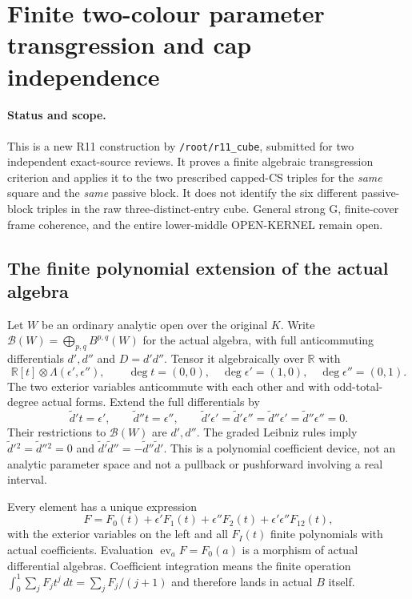 \section{Finite two-colour parameter transgression and cap independence}
\label{sec:r11-cap-parameter}

\paragraph{Status and scope.}
This is a new R11 construction by \texttt{/root/r11\_cube}, submitted
for two independent exact-source reviews.  It proves a finite algebraic
transgression criterion and applies it to the two prescribed capped-CS
triples for the \emph{same} square and the \emph{same} passive block.
It does not identify the six different passive-block triples in the
raw three-distinct-entry cube.  General strong G, finite-cover frame
coherence, and the entire lower-middle OPEN-KERNEL remain open.

\subsection{The finite polynomial extension of the actual algebra}

Let $W$ be an ordinary analytic open over the original $K$.  Write
$\mathscr B(W)=\bigoplus_{p,q}B^{p,q}(W)$ for the actual algebra,
with full anticommuting differentials $d',d''$ and $D=d'd''$.
Tensor it algebraically over $\mathbb R$ with
\[
 \mathbb R[t]\otimes\Lambda(\epsilon',\epsilon''),
 \qquad \deg t=(0,0),\quad
 \deg\epsilon'=(1,0),\quad\deg\epsilon''=(0,1).
 \tag{CT1}
\]
The two exterior variables anticommute with each other and with
odd-total-degree actual forms.  Extend the full differentials by
\[
 \widetilde d't=\epsilon',\qquad
 \widetilde d''t=\epsilon'',\qquad
 \widetilde d'\epsilon'=\widetilde d'\epsilon''
 =\widetilde d''\epsilon'=\widetilde d''\epsilon''=0.
 \tag{CT2}
\]
Their restrictions to $\mathscr B(W)$ are $d',d''$.  The graded
Leibniz rules imply $\widetilde d'{}^2=\widetilde d''{}^2=0$ and
$\widetilde d'\widetilde d''=-\widetilde d''\widetilde d'$.
This is a polynomial coefficient device, not an analytic parameter
space and not a pullback or pushforward involving a real interval.

Every element has a unique expression
\[
 F=F_0(t)+\epsilon'F_1(t)+\epsilon''F_2(t)
                          +\epsilon'\epsilon''F_{12}(t),
 \tag{CT3}
\]
with the exterior variables on the left and all $F_I(t)$ finite
polynomials with actual coefficients.  Evaluation
$\operatorname{ev}_a F=F_0(a)$ is a morphism of actual differential
algebras.  Coefficient integration means the finite operation
$\int_0^1\sum_jF_jt^j\,dt=\sum_jF_j/(j+1)$ and therefore lands in
actual $B$ itself.

